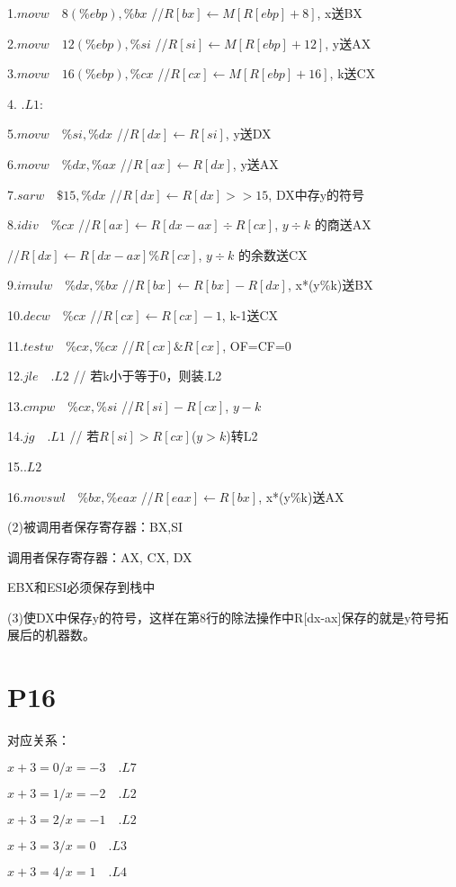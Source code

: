 \documentclass{article}
\begin{document}
1.$movw \quad 8(\% ebp), \% bx$  \quad //$R[bx] \gets M[R[ebp]+8]$, x送BX

2.$movw \quad 12(\% ebp), \% si$  \quad //$R[si] \gets M[R[ebp]+12]$, y送AX

3.$movw \quad 16(\% ebp), \% cx$  \quad //$R[cx] \gets M[R[ebp]+16]$, k送CX

4. $.L1:$

5.$movw \quad \% si, \% dx$  \quad //$R[dx] \gets R[si]$, y送DX

6.$movw \quad \% dx, \% ax$  \quad //$R[ax] \gets R[dx]$, y送AX

7.$sarw \quad \$ 15, \% dx$  \quad //$R[dx] \gets R[dx] >> 15$, DX中存y的符号

8.$idiv \quad \% cx$  \quad //$R[ax] \gets R[dx-ax] \div R[cx]$,  $y \div k$ 的商送AX

\qquad \qquad \qquad //$R[dx] \gets R[dx-ax] \% R[cx]$,  $y \div k$ 的余数送CX

9.$imulw \quad \% dx, \% bx$  \quad //$R[bx] \gets R[bx] - R[dx] $, x*(y\%k)送BX

10.$decw \quad \% cx$  \quad //$R[cx] \gets R[cx]-1$,  k-1送CX

11.$testw \quad \% cx, \%cx$  \quad //$R[cx] \& R[cx]$,  OF=CF=0

12.$jle \quad .L2$ \quad // 若k小于等于0，则装.L2

13.$cmpw \quad \% cx, \% si$  \quad //$R[si] - R[cx]$, $y-k$

14.$jg \quad .L1$ \quad // 若$R[si] > R[cx]$($y>k$)转L2

15.$.L2$

16.$movswl \quad \% bx, \% eax$  \quad //$R[eax] \gets R[bx]$, x*(y\%k)送AX

(2)被调用者保存寄存器：BX,SI

调用者保存寄存器：AX, CX, DX

EBX和ESI必须保存到栈中

(3)使DX中保存y的符号，这样在第8行的除法操作中R[dx-ax]保存的就是y符号拓展后的机器数。

\section{P16}
对应关系：

$x+3=0/x=-3 \quad .L7$

$x+3=1/x=-2 \quad .L2$

$x+3=2/x=-1 \quad .L2$

$x+3=3/x=0 \quad .L3$

$x+3=4/x=1 \quad .L4$
\end{document}
